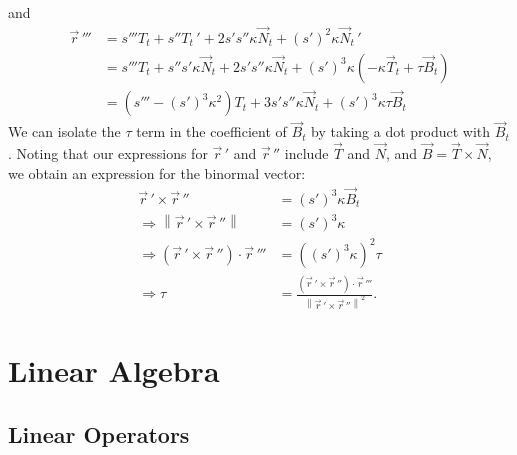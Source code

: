 \documentclass{article}
\theoremstyle{definition}
\begin{document}
and
\begin{align*}
	\vec r\,'''&=s'''T_t+s''T_t\,'+2s's''\kappa \vec N_t+(s')^2\kappa \vec N_t\,'\\
	&=s'''T_t+s''s'\kappa \vec N_t+2s's''\kappa \vec N_t+(s')^3\kappa(-\kappa \vec T_t+\tau\vec B_t)\\
	&=(s'''-(s')^3\kappa^2)T_t+3s's''\kappa\vec N_t+(s')^3\kappa\tau\vec B_t
\end{align*}
We can isolate the $\tau$ term in the coefficient of $\vec B_t$ by taking a dot product with $\vec B_t$. Noting that our expressions for $\vec r\,'$ and $\vec r\,''$ include $\vec T$ and $\vec N$, and $\vec B=\vec T\times\vec N$, we obtain an expression for the binormal vector:
\begin{align*}
	\vec r\,'\times\vec r\,''&=(s')^3\kappa\vec B_t\\
	\Rightarrow\left\lVert\vec r\,'\times\vec r\,''\right\rVert&=(s')^3\kappa\\
	\Rightarrow(\vec r\,'\times\vec r\,'')\cdot\vec r\,'''&=((s')^3\kappa)^2\tau\\
	\Rightarrow\tau&=\frac{(\vec r\,'\times\vec r\,'')\cdot\vec r\,'''}{\left\lVert\vec r\,'\times\vec r\,''\right\rVert^2}.
\end{align*}
\section{Linear Algebra}
\subsection{Linear Operators}
\end{document}
